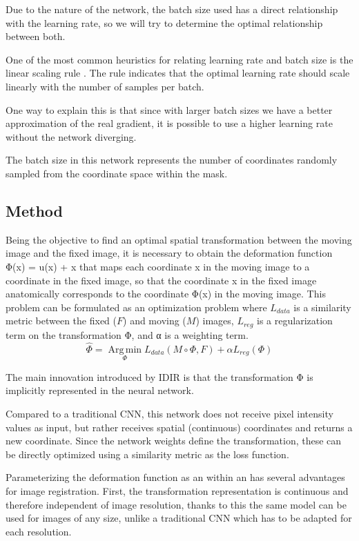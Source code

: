 Due to the nature of the network, the batch size used has a direct relationship with the learning rate, so we will try to determine the optimal relationship between both.

One of the most common heuristics for relating learning rate and batch size is the linear scaling rule \cite{goyal2018accuratelargeminibatchsgd}.
The rule indicates that the optimal learning rate should scale linearly with the number of samples per batch.

One way to explain this is that since with larger batch sizes we have a better approximation of the real gradient, it is possible to use a higher learning rate without the network diverging. \cite{kexuefm}

The batch size in this network represents the number of coordinates randomly sampled from the coordinate space within the mask.

\subsection{Method}\label{subsubsec:Method}

Being the objective to find an optimal spatial transformation between the moving image and the fixed image,
it is necessary to obtain the deformation function Φ(x) = u(x) + x that maps each coordinate x in the moving image to a coordinate in the fixed image,
so that the coordinate x in the fixed image anatomically corresponds to the coordinate Φ(x) in the moving image.
This problem can be formulated as an optimization problem where $L_{data}$ is a similarity metric between the fixed ($F$) and moving ($M$) images, $L_{reg}$ is a regularization term on the transformation Φ, and α is a weighting term.
\begin{equation}
    \hat{\Phi} = \operatorname*{Arg\,min}_{\Phi} L_{data}(M \circ \Phi, F) + \alpha L_{reg}(\Phi)
\end{equation}

The main innovation introduced by IDIR\cite{wolterink2021implicit} is that the transformation Φ is implicitly represented in the neural network.

Compared to a traditional CNN, this network does not receive pixel intensity values as input,
but rather receives spatial (continuous) coordinates and returns a new coordinate.
Since the network weights define the transformation, these can be directly optimized
using a similarity metric as the loss function.

Parameterizing the deformation function as an  within an  has several advantages for image registration.
First, the transformation representation is continuous and therefore independent of image resolution,
thanks to this the same model can be used for images of any size, unlike a traditional CNN
which has to be adapted for each resolution.

